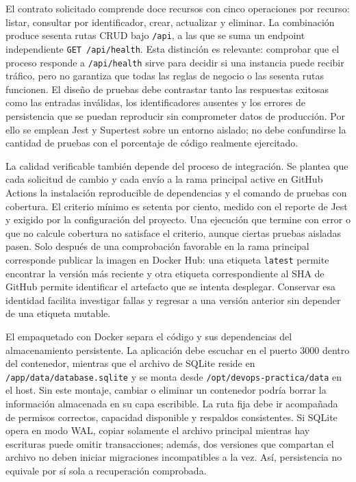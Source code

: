 \documentclass[12pt,a4paper]{article}
\begin{document}
El contrato solicitado comprende doce recursos con cinco operaciones por recurso: listar, consultar por identificador, crear, actualizar y eliminar. La combinación produce sesenta rutas CRUD bajo \texttt{/api}, a las que se suma un endpoint independiente \texttt{GET /api/health}. Esta distinción es relevante: comprobar que el proceso responde a \texttt{/api/health} sirve para decidir si una instancia puede recibir tráfico, pero no garantiza que todas las reglas de negocio o las sesenta rutas funcionen. El diseño de pruebas debe contrastar tanto las respuestas exitosas como las entradas inválidas, los identificadores ausentes y los errores de persistencia que se puedan reproducir sin comprometer datos de producción. Por ello se emplean Jest y Supertest sobre un entorno aislado; no debe confundirse la cantidad de pruebas con el porcentaje de código realmente ejercitado.

La calidad verificable también depende del proceso de integración. Se plantea que cada solicitud de cambio y cada envío a la rama principal active en GitHub Actions la instalación reproducible de dependencias y el comando de pruebas con cobertura. El criterio mínimo es setenta por ciento, medido con el reporte de Jest y exigido por la configuración del proyecto. Una ejecución que termine con error o que no calcule cobertura no satisface el criterio, aunque ciertas pruebas aisladas pasen. Solo después de una comprobación favorable en la rama principal corresponde publicar la imagen en Docker Hub: una etiqueta \texttt{latest} permite encontrar la versión más reciente y otra etiqueta correspondiente al SHA de GitHub permite identificar el artefacto que se intenta desplegar. Conservar esa identidad facilita investigar fallas y regresar a una versión anterior sin depender de una etiqueta mutable.

El empaquetado con Docker separa el código y sus dependencias del almacenamiento persistente. La aplicación debe escuchar en el puerto 3000 dentro del contenedor, mientras que el archivo de SQLite reside en \texttt{/app/data/database.sqlite} y se monta desde \texttt{/opt/devops-practica/data} en el host. Sin este montaje, cambiar o eliminar un contenedor podría borrar la información almacenada en su capa escribible. La ruta fija debe ir acompañada de permisos correctos, capacidad disponible y respaldos consistentes. Si SQLite opera en modo WAL, copiar solamente el archivo principal mientras hay escrituras puede omitir transacciones; además, dos versiones que compartan el archivo no deben iniciar migraciones incompatibles a la vez. Así, persistencia no equivale por sí sola a recuperación comprobada.
\end{document}
